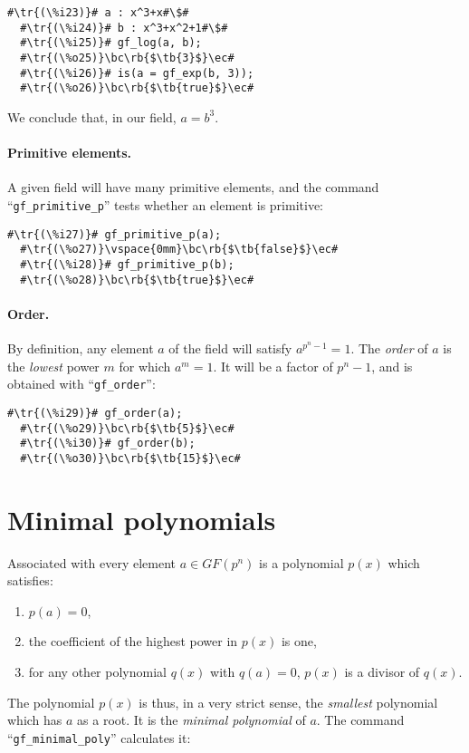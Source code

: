\documentclass[a4paper,11pt,leqno,fleqn]{artikel3}
\newcommand{\bc}{\begin{center}}
\newcommand{\ec}{\end{center}}
\newcommand{\tr}[1]{\textcolor{red}{#1}}
\newcommand{\tb}[1]{\textcolor{blue}{#1}}
\newcommand{\rb}[1]{\raisebox{2mm}[0mm][1mm]{#1}}
\begin{document}
\vspace*{2mm}
\begin{lstlisting}[escapechar=\#]
  #\tr{(\%i23)}# a : x^3+x#\$#
  #\tr{(\%i24)}# b : x^3+x^2+1#\$#
  #\tr{(\%i25)}# gf_log(a, b);
  #\tr{(\%o25)}\bc\rb{$\tb{3}$}\ec#
  #\tr{(\%i26)}# is(a = gf_exp(b, 3));
  #\tr{(\%o26)}\bc\rb{$\tb{true}$}\ec#
\end{lstlisting}

We conclude that, in our field, $a=b^{3}$.


\paragraph{Primitive elements.}

A given field will have many primitive elements, and the command \\
``\verb!gf_primitive_p!'' tests whether an element is primitive:

\vspace*{2mm}
\begin{lstlisting}[escapechar=\#]
  #\tr{(\%i27)}# gf_primitive_p(a);
  #\tr{(\%o27)}\vspace{0mm}\bc\rb{$\tb{false}$}\ec#
  #\tr{(\%i28)}# gf_primitive_p(b);
  #\tr{(\%o28)}\bc\rb{$\tb{true}$}\ec#
\end{lstlisting}


\paragraph{Order.}

By definition, any element $a$ of the field will satisfy $a^{p^n-1}=1$.  The
\emph{order} of $a$ is the \emph{lowest} power $m$ for which $a^m=1$.  It will
be a factor of $p^n-1$, and is obtained with ``\verb!gf_order!'':

\vspace*{2mm}
\begin{lstlisting}[escapechar=\#]
  #\tr{(\%i29)}# gf_order(a);
  #\tr{(\%o29)}\bc\rb{$\tb{5}$}\ec#
  #\tr{(\%i30)}# gf_order(b);
  #\tr{(\%o30)}\bc\rb{$\tb{15}$}\ec#
\end{lstlisting}


\section*{Minimal polynomials}

Associated with every element $a\in GF(p^n)$ is a polynomial $p(x)$ which
satisfies:
\begin{enumerate}
\item $p(a)=0$,
\item the coefficient of the highest power in $p(x)$ is one,
\item for any other polynomial $q(x)$ with $q(a)=0$, $p(x)$ is a divisor of $q(x)$.
\end{enumerate}
The polynomial $p(x)$ is thus, in a very strict sense, the \emph{smallest}
polynomial which has $a$ as a root.  It is the \emph{minimal polynomial} of
$a$.  The command ``\verb!gf_minimal_poly!'' calculates it:
\end{document}
